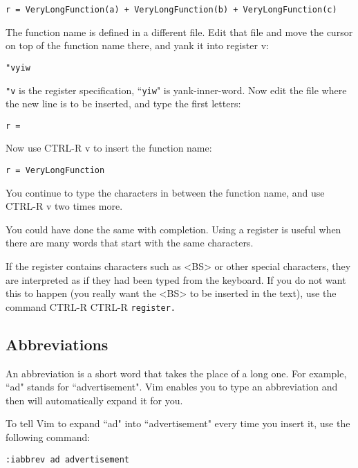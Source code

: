 \begin{Verbatim}[samepage=true]
    r = VeryLongFunction(a) + VeryLongFunction(b) + VeryLongFunction(c) 
\end{Verbatim}

The function name is defined in a different file.
Edit that file and move the cursor on top of the function name there, and yank it into register v:

\begin{Verbatim}[samepage=true]
 "vyiw
\end{Verbatim}

\texttt{"v} is the register specification, ``\texttt{yiw}" is yank-inner-word.
Now edit the file where the new line is to be inserted, and type the first letters:

\begin{Verbatim}[samepage=true]
    r = 
\end{Verbatim}

Now use CTRL-R v to insert the function name:

\begin{Verbatim}[samepage=true]
    r = VeryLongFunction 
\end{Verbatim}

You continue to type the characters in between the function name, and use CTRL-R v two times more.

You could have done the same with completion.
Using a register is useful when there are many words that start with the same characters.

If the register contains characters such as <BS> or other special characters, they are interpreted as if they had been typed from the keyboard.
If you do not want this to happen (you really want the <BS> to be inserted in the text), use the command CTRL-R CTRL-R \texttt{{register}.}
\subsection{Abbreviations}
An abbreviation is a short word that takes the place of a long one.
For example, ``ad" stands for ``advertisement".
Vim enables you to type an abbreviation and then will automatically expand it for you.

To tell Vim to expand ``ad" into ``advertisement" every time you insert it, use the following command:

\begin{Verbatim}[samepage=true]
 :iabbrev ad advertisement
\end{Verbatim}

